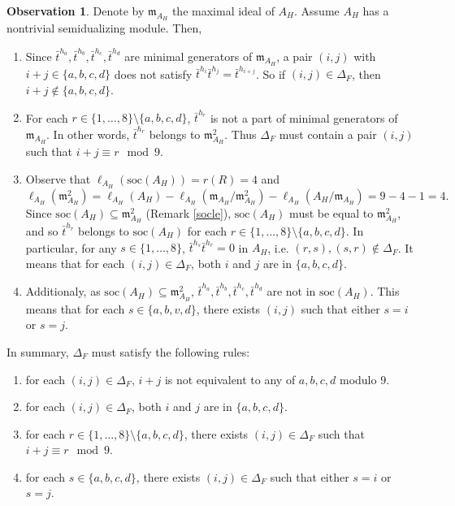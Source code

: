 \documentclass{amsart}
\theoremstyle{plain}
\theoremstyle{definition}
\newtheorem{obs}[theorem]{Observation}
\numberwithin{theorem}{section}
\numberwithin{equation}{section}
\numberwithin{equation}{theorem}
\begin{document}
\begin{obs}
Denote by $\mathfrak{m}_{A_H}$ the maximal ideal of $A_H$.
Assume $A_H$ has a nontrivial semidualizing module.
Then,
\begin{enumerate}[ \rm (i)]
\item Since $\bar{t}^{h_a},\bar{t}^{h_b},\bar{t}^{h_c},\bar{t}^{h_d}$ are minimal generators of $\mathfrak{m}_{A_H}$,
a pair $(i,j)$ with $i+j\in\{a,b,c,d\}$ does not satisfy $\bar{t}^{h_i}\bar{t}^{h_j}=\bar{t}^{h_{i+j}}$. 
So if $(i,j) \in \Delta_F$, then $i+j \not \in \{a,b,c,d\}$.
\item For each $r\in \{1,\dots, 8\}\setminus\{a,b,c,d\}$, $\bar{t}^{h_r}$ is not a part of minimal generators of $\mathfrak{m}_{A_H}$.
In other words, $\bar{t}^{h_r}$ belongs to $\mathfrak{m}_{A_H}^2$.
Thus $\Delta_F$ must contain a pair $(i,j)$ such that $i+j \equiv r \mod 9$.
\item Observe that $\ell_{A_H}(\mathrm{soc}(A_H))=r(R)=4$ and 
\[
\ell_{A_H}(\mathfrak{m}_{A_H}^2)=\ell_{A_H}(A_H) -\ell_{A_H}( \mathfrak{m}_{A_H}/\mathfrak{m}_{A_H}^2)-\ell_{A_H} (A_H/\mathfrak{m}_{A_H})=9-4-1=4.
\]
Since $\mathrm{soc}(A_H) \subseteq \mathfrak{m}_{A_H}^2$ (Remark \ref{socle}), $\mathrm{soc}(A_H)$ must be equal to $\mathfrak{m}_{A_H}^2$, and so $\bar{t}^{h_r}$ belongs to $\mathrm{soc}(A_H)$ for each $r\in\{1,\dots,8\}\setminus\{a,b,c,d\}$.
In particular, for any $s \in \{1,\dots,8\}$, $\bar{t}^{h_s}\bar{t}^{h_r}=0$ in $A_H$, i.e. $(r,s),(s,r)\not\in \Delta_F$.
It means that for each $(i,j) \in \Delta_F$, both $i$ and $j$ are in $\{a,b,c,d\}$.

\item Additionaly, as $\mathrm{soc}(A_H) \subseteq \mathfrak{m}_{A_H}^2$, $\bar{t}^{h_a},\bar{t}^{h_b},\bar{t}^{h_c},\bar{t}^{h_d}$ are not in $\mathrm{soc}(A_H)$.
This means that for each $s\in \{a,b,v,d\}$, there exists $(i,j)$ such that either $s=i$ or $s=j$.
\end{enumerate}
\end{obs}






In summary, $\Delta_F$ must satisfy the following rules:
\begin{enumerate}[ \rm(R1)]
\item for each $(i,j) \in \Delta_F$, $i+j$ is not equivalent to any of $a,b,c,d$ modulo $9$.
\item for each $(i,j) \in \Delta_F$, both $i$ and $j$ are in $\{a,b,c,d\}$.
\item for each $r\in \{1,\dots, 8\}\setminus\{a,b,c,d\}$, there exists $(i,j)\in \Delta_F$ such that $i+j \equiv r \mod 9$.
\item for each $s\in \{a,b,c,d\}$, there exists $(i,j)\in \Delta_F$ such that either $s=i$ or $s=j$.
\end{enumerate}
\end{document}
